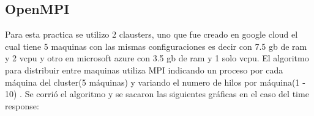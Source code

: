 \documentclass{IEEEtran}
\begin{document}
\begin{itemize}

\end{itemize}

\subsection{OpenMPI}
Para esta practica se utilizo 2 clausters, uno que fue creado en google cloud el cual tiene 5 maquinas con las mismas configuraciones es decir con 7.5 gb de ram y 2 vcpu y otro en microsoft azure con 3.5 gb de ram y 1 solo vcpu. El algoritmo para distribuir entre maquinas utiliza MPI indicando un proceso por cada máquina del cluster(5 máquinas) y variando el numero de hilos por máquina(1 - 10) .  Se corrió el algoritmo y se sacaron las siguientes gráficas en el caso del time response:
\end{document}
